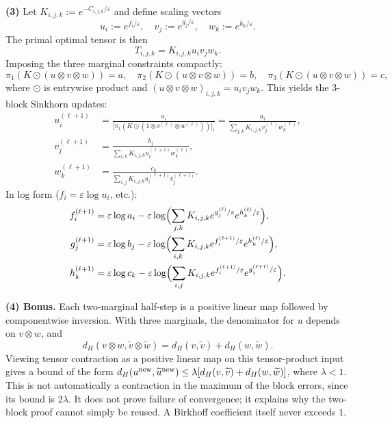\documentclass[11pt,a4paper]{article}
\theoremstyle{exostyle}
\begin{document}
\begin{solution}
\medskip
\textbf{(3)} Let $K_{i,j,k} := e^{-C_{i,j,k}/\varepsilon}$ and define scaling vectors
\[
u_i := e^{f_i/\varepsilon},\quad
v_j := e^{g_j/\varepsilon},\quad
w_k := e^{h_k/\varepsilon}.
\]
The primal optimal tensor is then
\[
T_{i,j,k} = K_{i,j,k} u_i v_j w_k.
\]
Imposing the three marginal constraints compactly:
\[
\pi_1(K \odot (u\otimes v \otimes w)) = a,\quad
\pi_2(K \odot (u\otimes v \otimes w)) = b,\quad
\pi_3(K \odot (u\otimes v \otimes w)) = c,
\]
where $\odot$ is entrywise product and $(u\otimes v \otimes w)_{i,j,k}=u_i v_j w_k$.
This yields the 3-block Sinkhorn updates:
\begin{align*}
u_i^{(\ell+1)} &= \frac{a_i}{\bigl[\pi_1(K \odot (1\otimes v^{(\ell)} \otimes w^{(\ell)}))\bigr]_i}
= \frac{a_i}{\displaystyle \sum_{j,k} K_{i,j,k} v_j^{(\ell)} w_k^{(\ell)}},\\
v_j^{(\ell+1)} &= \frac{b_j}{\displaystyle \sum_{i,k} K_{i,j,k} u_i^{(\ell+1)} w_k^{(\ell)}},\\
w_k^{(\ell+1)} &= \frac{c_k}{\displaystyle \sum_{i,j} K_{i,j,k} u_i^{(\ell+1)} v_j^{(\ell+1)}}.
\end{align*}
In log form ($f_i=\varepsilon\log u_i$, etc.):
\begin{align*}
f_i^{(\ell+1)} &= \varepsilon \log a_i
- \varepsilon \log \Bigl( \sum_{j,k} K_{i,j,k} e^{g_j^{(\ell)}/\varepsilon} e^{h_k^{(\ell)}/\varepsilon} \Bigr),\\
g_j^{(\ell+1)} &= \varepsilon \log b_j
- \varepsilon \log \Bigl( \sum_{i,k} K_{i,j,k} e^{f_i^{(\ell+1)}/\varepsilon} e^{h_k^{(\ell)}/\varepsilon} \Bigr),\\
h_k^{(\ell+1)} &= \varepsilon \log c_k
- \varepsilon \log \Bigl( \sum_{i,j} K_{i,j,k} e^{f_i^{(\ell+1)}/\varepsilon} e^{g_j^{(\ell+1)}/\varepsilon} \Bigr).
\end{align*}

\medskip

\textbf{(4) Bonus.} Each two-marginal half-step is a positive linear map followed by componentwise inversion. With three marginals, the denominator for $u$ depends on $v\otimes w$, and
\[
d_H(v\otimes w,\widetilde v\otimes\widetilde w)
=d_H(v,\widetilde v)+d_H(w,\widetilde w).
\]
Viewing tensor contraction as a positive linear map on this tensor-product input gives a bound of the form
$d_H(u^{\rm new},\widetilde u^{\rm new})\le\lambda[d_H(v,\widetilde v)+d_H(w,\widetilde w)]$, where $\lambda<1$. This is not automatically a contraction in the maximum of the block errors, since its bound is $2\lambda$. It does not prove failure of convergence; it explains why the two-block proof cannot simply be reused. A Birkhoff coefficient itself never exceeds $1$.
\end{solution}
\end{document}
